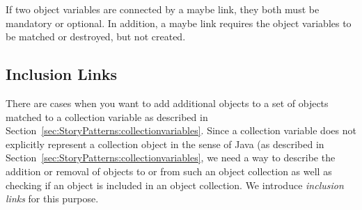 If two object variables are connected by a maybe link, they both must be mandatory or optional. In addition, a maybe link requires the object variables to be matched or destroyed, but not created.  



\subsection{Inclusion Links}
\label{sec:StoryPatterns:inclusion}

There are cases when you want to add additional objects to a set of objects matched to a collection variable as described in Section~\ref{sec:StoryPatterns:collectionvariables}.
Since a collection variable does not explicitly represent a collection object in
the sense of Java (as described in Section~\ref{sec:StoryPatterns:collectionvariables}, we need a way to describe the addition or removal of
objects to or from such an object collection as well as checking if an object is included in an object collection. We introduce \emph{inclusion links} for this purpose.

